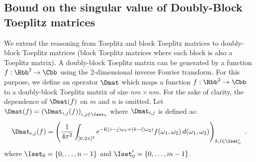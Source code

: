 %
%

\subsection{Bound on the singular value of Doubly-Block Toeplitz matrices}
\label{subsection:ch5-bound_on_the_singular_value_of_doubly-block_toeplitz_matrices}

We extend the reasoning from Toeplitz and block Toeplitz matrices to doubly-block Toeplitz matrices (\ie block Toeplitz matrices where each block is also a Toeplitz matrix).
A doubly-block Toeplitz matrix can be generated by a function $f: \Rbb^2 \rightarrow \Cbb$ using the 2-dimensional inverse Fourier transform.
For this purpose, we define an operator $\Dmat$ which maps a function $f: \Rbb^2 \rightarrow \Cbb$ to a doubly-block Toeplitz matrix of size $nm \times nm$.
For the sake of clarity, the dependence of $\Dmat(f)$  on $m$ and $n$ is omitted.
Let $\Dmat(f) = \leftmat \Dmat_{i,j}(f)\rightmat_{i,j \in \Iset_0}$ where $\Dmat_{i,j}$ is defined as:
\begin{equation} \label{equation:doubly_block_toeplitz_operator}
  \Dmat_{i,j}(f) = \leftmat \frac{1}{4\pi^{2}} \int_{[0,2\pi]^{2}} e^{- \ci \left((i-j)\omega_{1}+(k-l)\omega_{2}\right)}f(\omega_{1},\omega_{2})\,d(\omega_{1},\omega_{2}) \rightmat_{k,l \in \Iset_0'} \enspace.
\end{equation}
where $\Iset_0 = \{0, \dots, n-1 \}$ and $\Iset_0' = \{0, \dots, m-1 \}$.

